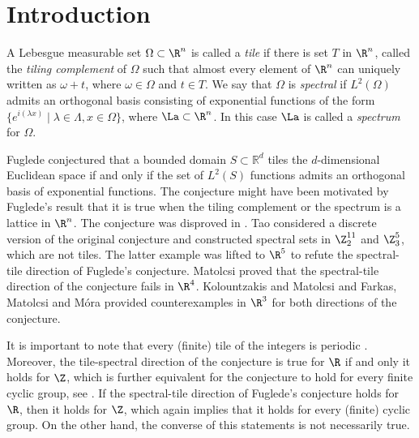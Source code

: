         \section{Introduction}
        A Lebesgue measurable set $\Omega \subset \R^n$ is called a {\it tile} if there is set $T$ in $\R^n$, called the {\it tiling complement} of $\Omega$ such that almost every element of $\R^n$ can uniquely written as $\omega+t$, where $\omega \in \Omega $ and $t \in T$.
        We say that $\Omega$ is {\it spectral} if $L^2(\Omega)$ admits an orthogonal basis consisting of exponential functions of the form $\{ e^{i (\lambda  x)} \mid \lambda \in \Lambda, x \in \Omega \}$, where $\La \subset \R^n$. In this case $\La$ is called a {\it spectrum } for $\Omega$. 
        
        
        Fuglede conjectured \cite{F1974} that a bounded domain $S \subset \mathbb{R}^d$ tiles the $d$-dimensional Euclidean space if and only if the set of $L^2(S)$ functions admits an orthogonal basis of exponential functions. The conjecture might have been motivated by Fuglede's result \cite{F1974} that it is true when the tiling complement or the spectrum is a lattice in
        $\R^n$. The conjecture was disproved in \cite{T2004}. Tao considered a discrete version of the original conjecture and constructed spectral sets in $\Z_2^{11}$ and $\Z_3^5$, which are not tiles. The latter example was lifted to $\R^5$ to refute the spectral-tile direction of Fuglede's conjecture. 
        Matolcsi \cite{M2004} proved that the spectral-tile direction of the conjecture
        fails in $\R^4$. Kolountzakis and Matolcsi
        \cite{KMkishalmaz,KM2006a} and Farkas, Matolcsi and M\'ora \cite{FMM2006}
        provided counterexamples in $\R^3$ for both 
        directions of the conjecture. 
        
        It is important to note that every (finite) tile of the integers is periodic \cite{cm}. Moreover, the tile-spectral direction of the conjecture is true for $\R$ if and only it holds for $\Z$, which is further equivalent for the conjecture to hold for every finite cyclic group, see \cite{DL2014}. If the spectral-tile direction of Fuglede's conjecture holds for $\R$, then it holds for $\Z$, which again implies that it holds for every (finite) cyclic group. On the other hand, the converse of this statements is not necessarily true. 
        
